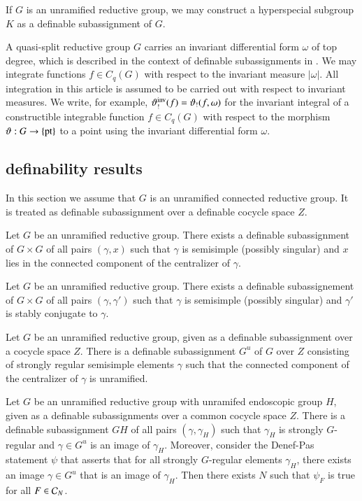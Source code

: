 If $G$ is an unramified reductive group, we may construct a hyperspecial subgroup $K$ as a definable subassignment of $G$.

A quasi-split reductive group $G$ carries an invariant differential form $\omega$ of top degree, which is described in the
context of definable subassignments in \cite{gordon}.
We may integrate functions $f\in C_q(G)$ with respect to the invariant measure $|\omega|$.
All integration in this article is assumed to be carried out with respect to invariant measures.  We write, for example,
$\vartheta_!^{\operatorname{inv}}(f) = \vartheta_!(f,\omega)$ for the invariant integral of a constructible integrable function $f\in C_q(G)$ with respect to the
morphism $\vartheta:G\to\{{\operatorname{pt}}\}$ to a point using the invariant differential form $\omega$.

\subsection{definability results}\label{sec:definability}

In this section we assume that $G$ is an unramified connected reductive group.  It is treated  as definable subassignment
over a definable cocycle space $Z$.

\begin{lemma}  Let $G$ be an unramified reductive group.  There exists a definable subassignment of $G\times G$ of all pairs
$(\gamma,x)$ such that $\gamma$ is semisimple (possibly singular) and $x$ lies in the connected component of the centralizer of $\gamma$.
\end{lemma}

\begin{lemma} Let $G$ be an unramified reductive group.  There exists a definable subassignement of $G\times G$ of all pairs
$(\gamma,\gamma')$ such that $\gamma$ is semisimple (possibly singular) and $\gamma'$ is stably conjugate to $\gamma$.
\end{lemma}

\begin{lemma} Let $G$ be an unramified reductive group, given as a definable subassignment over a cocycle space $Z$.
There is a definable subassignment $G^u$ of $G$ over $Z$ 
consisting of strongly regular semisimple elements $\gamma$ such that
the connected component of the centralizer of $\gamma$ is unramified. 
\end{lemma}

\begin{lemma} Let $G$ be an unramified reductive group with unramifed endoscopic group $H$, given as a definable subassignments over a common cocycle space $Z$.
There is a definable subassignment $GH$ of all pairs $(\gamma,\gamma_H)$ such that $\gamma_H$ is strongly $G$-regular and $\gamma\in G^u$ is an image of $\gamma_H$.
Moreover,
consider the Denef-Pas statement $\psi$ that asserts that for all strongly $G$-regular elements $\gamma_H$, there exists an image $\gamma\in G^u$ that is an image of $\gamma_H$.
Then there exists $N$ such that $\psi_F$ is true for all $F\in\mathcal C_N$.
\end{lemma}

